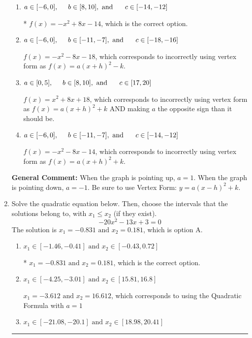 \documentclass{extbook}[14pt]
\newcommand{\litem}[1]{\item #1

\rule{\textwidth}{0.4pt}}
\begin{document}
\begin{enumerate}
{\begin{enumerate}[label=\Alph*.]
$f(x)=x^{2} -8 x + 18$, which corresponds to making $a$ the opposite sign than it should be.
\item \( a \in [-6, 0], \hspace*{5mm} b \in [8, 10], \text{ and } \hspace*{5mm} c \in [-14, -12] \)

* $f(x)=-x^{2} +8 x -14$, which is the correct option.
\item \( a \in [-6, 0], \hspace*{5mm} b \in [-11, -7], \text{ and } \hspace*{5mm} c \in [-18, -16] \)

$f(x)=-x^{2} -8 x -18$, which corresponds to incorrectly using vertex form as $f(x) = a(x+h)^2 - k$.
\item \( a \in [0, 5], \hspace*{5mm} b \in [8, 10], \text{ and } \hspace*{5mm} c \in [17, 20] \)

$f(x)=x^{2} +8 x + 18$, which corresponds to incorrectly using vertex form as $f(x) = a(x+h)^2+k$ AND making $a$ the opposite sign than it should be.
\item \( a \in [-6, 0], \hspace*{5mm} b \in [-11, -7], \text{ and } \hspace*{5mm} c \in [-14, -12] \)

$f(x)=-x^{2} -8 x -14$, which corresponds to incorrectly using vertex form as $f(x) = a(x+h)^2+k$.
\end{enumerate}

\textbf{General Comment:} When the graph is pointing up, $a=1$. When the graph is pointing down, $a=-1$. Be sure to use Vertex Form: $y = a(x-h)^2+k$.
}
\litem{
Solve the quadratic equation below. Then, choose the intervals that the solutions belong to, with $x_1 \leq x_2$ (if they exist).
\[ -20x^{2} -13 x + 3 = 0 \]The solution is \( x_1 = -0.831 \text{ and } x_2 = 0.181 \), which is option A.\begin{enumerate}[label=\Alph*.]
\item \( x_1 \in [-1.46, -0.41] \text{ and } x_2 \in [-0.43, 0.72] \)

* $x_1 = -0.831 \text{ and } x_2 = 0.181$, which is the correct option.
\item \( x_1 \in [-4.25, -3.01] \text{ and } x_2 \in [15.81, 16.8] \)

 $x_1 = -3.612 \text{ and } x_2 = 16.612$, which corresponds to using the Quadratic Formula with $a=1$
\item \( x_1 \in [-21.08, -20.1] \text{ and } x_2 \in [18.98, 20.41] \)


\end{enumerate}}
\end{enumerate}
\end{document}
